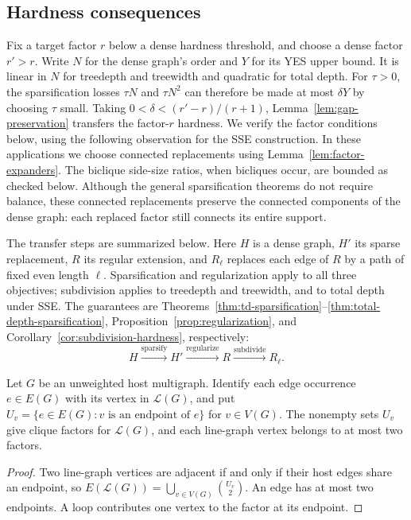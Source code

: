 \subsection{Hardness consequences}
\label{subsec:bounded-degree-consequences}

Fix a target factor $r$ below a dense hardness threshold, and choose
a dense factor $r'>r$. Write $N$ for the dense graph's order and
$Y$ for its YES upper bound. It is linear
in $N$ for treedepth and treewidth and quadratic for total depth.
For $\tau>0$, the sparsification losses $\tau N$ and $\tau N^2$ can therefore be made
at most $\delta Y$ by choosing $\tau$ small. Taking
$0<\delta<(r'-r)/(r+1)$, Lemma~\ref{lem:gap-preservation} transfers
the factor-$r$ hardness.
We verify the factor conditions below, using the following observation
for the SSE construction.
In these applications we choose connected replacements using
Lemma~\ref{lem:factor-expanders}. The biclique side-size ratios,
when bicliques occur, are bounded as checked below. Although the
general sparsification theorems do not require balance, these
connected replacements preserve the connected components of the
dense graph: each replaced factor still connects its entire support.

The transfer steps are summarized below. Here $H$ is a dense graph,
$H'$ its sparse replacement, $R$ its regular extension, and
$R_\ell$ replaces each edge of $R$ by a path of fixed even length
$\ell$. Sparsification and regularization apply to all three objectives;
subdivision applies to treedepth and treewidth, and to total depth under SSE.
The guarantees are Theorems~\ref{thm:td-sparsification}--\ref{thm:total-depth-sparsification},
Proposition~\ref{prop:regularization}, and
Corollary~\ref{cor:subdivision-hardness}, respectively:
\[
 H\xrightarrow{\text{sparsify}}H'
 \xrightarrow{\text{regularize}}R
 \xrightarrow{\text{subdivide}}R_\ell.
\]

\begin{lemma}\label{lem:linegraph-factors}
Let $G$ be an unweighted host multigraph. Identify each edge
occurrence $e\in E(G)$ with its vertex in $\mathcal L(G)$, and put
$U_v=\{e\in E(G):v\text{ is an endpoint of }e\}$ for $v\in V(G)$.
The nonempty sets
$U_v$ give clique factors for $\mathcal L(G)$, and each line-graph
vertex belongs to at most two factors.
\end{lemma}

\begin{proof}
Two line-graph vertices are adjacent if and only if their host edges
share an endpoint, so
$E(\mathcal L(G))=\bigcup_{v\in V(G)}\binom{U_v}{2}$.
An edge has at most two endpoints. A loop contributes one vertex
to the factor at its endpoint.
\end{proof}

